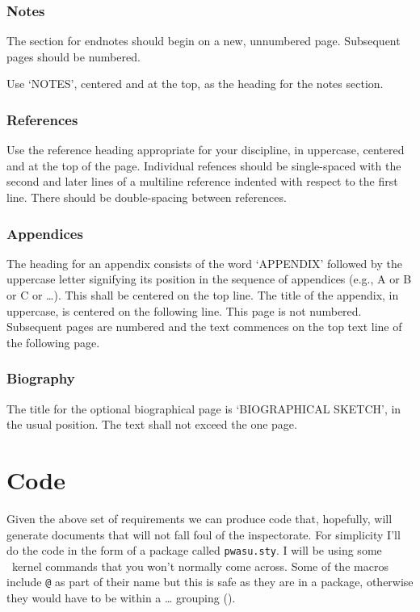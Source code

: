 \subsubsection{Notes}

    The section for endnotes should begin on a new, unnumbered page. Subsequent
pages should be numbered.

    Use `NOTES', centered and at the top, as the heading for the notes section.

\subsubsection{References}

    Use the reference heading appropriate for your discipline, in uppercase,
centered and at the top of the page. Individual refences 
should be single-spaced with the second and later lines of a multiline
reference indented with respect to the first line. 
There should be double-spacing between references.

\subsubsection{Appendices}

    The heading for an appendix consists of the word `APPENDIX' followed by 
the uppercase letter signifying its position in the sequence of appendices
(e.g., A or B or C or \ldots).
This shall be centered on the top line. The title of the appendix, in 
uppercase, is centered on the following line. This page is not numbered.
Subsequent pages are numbered and the text commences on the top text line
of the following page.

\subsubsection{Biography}

    The title for the optional biographical page is `BIOGRAPHICAL SKETCH', 
in the usual position. The text shall not exceed the one page.

\section{Code}

Given the above set of requirements we can produce code that,
hopefully, will generate documents that will not fall foul of the
inspectorate.  For simplicity I'll do the code in the form of a
package called \verb?pwasu.sty?.  I will be using some \ltx\ kernel
commands that you won't normally come across. Some of the macros
include \idxatincode\texttt{@} as part of their name but this is safe
as they are in a package, otherwise they would have to be within a
\cmd{\makeatletter} \ldots \cmd{\makeatother} grouping (\seeatincode).

